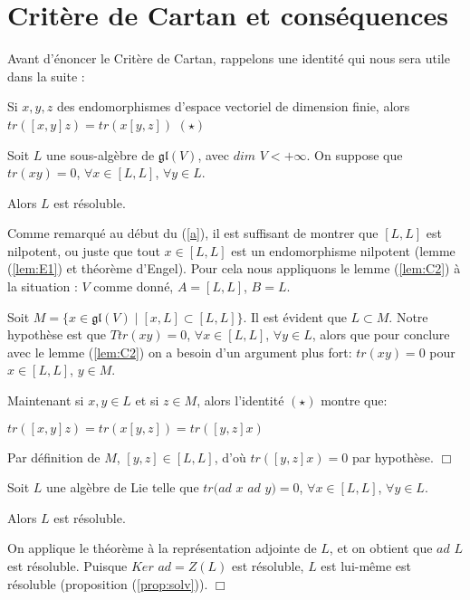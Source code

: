 \documentclass[a4paper,openany,12pt]{report}
\newcommand{\gl}{\mathfrak{gl}}
\theoremstyle{break}
{\theorembodyfont{\upshape}
\newtheorem*{rmq}{Remarque :}
\newtheorem*{prv}{Preuve :}
\newtheorem*{ex}{Exemples :}
\newtheorem*{exe}{Exemple : }
\newtheorem*{nota}{Notation :}
\newtheorem*{dem}{D\'emonstration :}}
\begin{document}
\section{Critère de Cartan et conséquences}\label{c}

Avant d'énoncer le Critère de Cartan, rappelons une identité qui nous sera utile dans la suite : 
\begin{center}
Si $x,y,z$ des endomorphismes d'espace vectoriel de dimension finie, alors $tr([x,y]z)=tr(x[y,z])$ $(\star)$
\end{center}

\begin{thm}\label{cartan}
Soit $L$ une sous-algèbre de $\gl(V)$, avec $dim$ $V<+\infty$. On suppose que $tr(xy)=0$, $\forall x \in [L,L]$, $\forall y \in L$.

Alors $L$ est résoluble. 
\end{thm}

\begin{dem}
\quad Comme remarqué au début du (\ref{a}), il est suffisant de montrer que $[L,L]$ est nilpotent, ou juste que tout $x \in [L,L]$ est un endomorphisme nilpotent (lemme (\ref{lem:E1}) et théorème d'Engel). Pour cela nous appliquons le lemme (\ref{lem:C2}) à la situation : $V$ comme donné, $A=[L,L]$, $B=L$.

Soit $M= \{ x \in \gl(V) \mid [x,L] \subset [L,L] \}$. Il est évident que $L \subset M$. Notre hypothèse est que $Ttr(xy)=0$, $\forall x \in [L,L]$, $\forall y \in L$, alors que pour conclure avec le lemme (\ref{lem:C2}) on a besoin d'un argument plus fort: \quad $tr(xy)=0$ pour $x \in [L,L]$, $y \in M$.

Maintenant si $x,y \in L$ et si $z \in M$, alors l'identité $(\star)$ montre que:
\begin{center}
$tr([x,y]z)=tr(x[y,z])=tr([y,z]x)$
\end{center}

Par définition de $M$, $[y,z] \in [L,L]$, d'où $tr([y,z]x)=0$ par hypothèse. $\Box$
\end{dem}

\begin{cor}
\quad Soit $L$ une algèbre de Lie telle que $tr(ad$ $x$ $ad$ $y) = 0$, $\forall x \in [L,L]$, $\forall y \in  L$.

Alors $L$ est résoluble.
\end{cor}

\begin{prv}
\quad On applique le théorème à la représentation adjointe de $L$, et on obtient que $ad$ $L$ est résoluble. Puisque $Ker$ $ad = Z(L)$ est résoluble, $L$ est lui-même est résoluble (proposition (\ref{prop:solv})). $\Box$
\end{prv}
\end{document}

